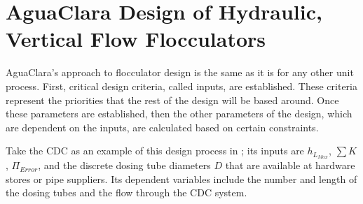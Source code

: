 \documentclass[letterpaper,10pt,english]{sphinxmanual}
\begin{document}
\section{AguaClara Design of Hydraulic, Vertical Flow Flocculators}
\label{\detokenize{Flocculation/Floc_Design:aguaclara-design-of-hydraulic-vertical-flow-flocculators}}
AguaClara’s approach to flocculator design is the same as it is for any other unit process. First, critical design criteria, called inputs, are established. These criteria represent the priorities that the rest of the design will be based around. Once these parameters are established, then the other parameters of the design, which are dependent on the inputs, are calculated based on certain constraints.

Take the CDC as an example of this design process in {\hyperref[\detokenize{Flow_Control_and_Measurement/FCM_Design:title-flow-control-design}]{}}; its inputs are \(h_{L_{Max}}\), \(\sum K\), \(\Pi_{Error}\), and the discrete dosing tube diameters  \(D\) that are available at hardware stores or pipe suppliers. Its dependent variables include the number and length of the dosing tubes and the flow through the CDC system.
\end{document}
